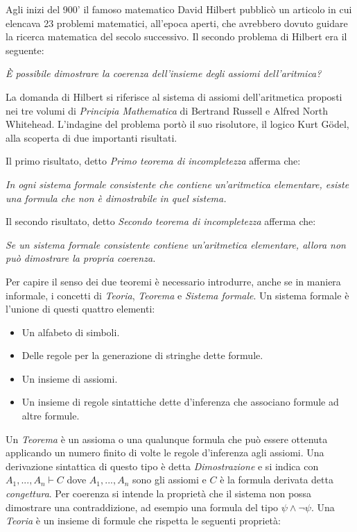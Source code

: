 \documentclass[./main.tex]{subfiles}
\begin{document}
Agli inizi del 900' il famoso matematico David Hilbert pubblicò un articolo in cui elencava 23 problemi matematici, all'epoca aperti,
che avrebbero dovuto guidare la ricerca matematica del secolo successivo. Il secondo problema di Hilbert era il seguente:

\begin{displayquote}
  \textit{È possibile dimostrare la coerenza dell'insieme degli assiomi dell'aritmica?}
\end{displayquote}

La domanda di Hilbert si riferisce al sistema di assiomi dell'aritmetica proposti nei tre volumi di \textit{Principia Mathematica}
di Bertrand Russell e Alfred North Whitehead.
L'indagine del problema portò il suo risolutore, il logico Kurt Gödel, alla scoperta di due importanti risultati.

Il primo risultato, detto \textit{Primo teorema di incompletezza} afferma che:

\begin{displayquote}
  \textit{In ogni sistema formale consistente che contiene un'aritmetica elementare, esiste una formula che non è dimostrabile in quel sistema.}
\end{displayquote}

Il secondo risultato, detto \textit{Secondo teorema di incompletezza} afferma che:

\begin{displayquote}
  \textit{Se un sistema formale consistente contiene un'aritmetica elementare, allora non può dimostrare la propria coerenza.}
\end{displayquote}

Per capire il senso dei due teoremi è necessario introdurre, anche se in maniera informale, i concetti di \textit{Teoria}, \textit{Teorema} e \textit{Sistema formale}.
Un sistema formale è l'unione di questi quattro elementi:

\begin{itemize}
  \item Un alfabeto di simboli.
  \item Delle regole per la generazione di stringhe dette formule.
  \item Un insieme di assiomi.
  \item Un insieme di regole sintattiche dette d'inferenza che associano formule ad altre formule.
\end{itemize}

Un \textit{Teorema} è un assioma o una qualunque formula che può essere ottenuta applicando un numero finito di volte le regole d'inferenza agli assiomi.
Una derivazione sintattica di questo tipo è detta \textit{Dimostrazione} e si indica con $ A_1, ..., A_n \vdash C$
dove $A_1, ..., A_n$ sono gli assiomi e $C$ è la formula derivata detta \textit{congettura}.
Per coerenza si intende la proprietà che il sistema non possa dimostrare una contraddizione,
ad esempio una formula del tipo $\psi \land \lnot \psi$.
Una \textit{Teoria} è un insieme di formule che rispetta le seguenti proprietà:
\end{document}
